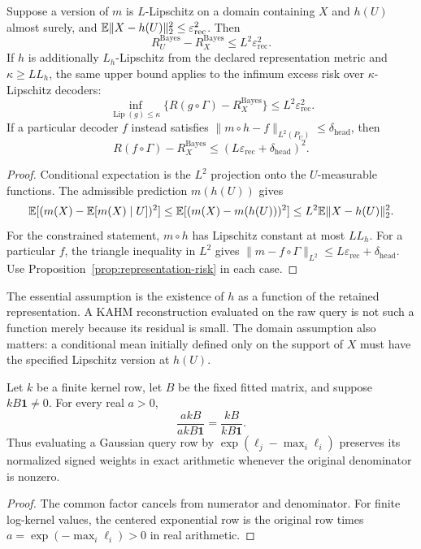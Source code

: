 \begin{proposition}
\label{prop:reconstruction-bridge}
Suppose a version of $m$ is $L$-Lipschitz on a domain containing $X$ and
$h(U)$ almost surely, and
$\mathbb{E}\|X-h(U)\|_2^2\leq\varepsilon_{\mathrm{rec}}^2$.
Then
\[
 R_U^{\mathrm{Bayes}}-R_X^{\mathrm{Bayes}}
 \leq L^2\varepsilon_{\mathrm{rec}}^2.
\]
If $h$ is additionally $L_h$-Lipschitz from the declared representation
metric and $\kappa\geq LL_h$, the same upper bound applies to the
infimum excess risk over $\kappa$-Lipschitz decoders:
\[
 \inf_{\operatorname{Lip}(g)\leq\kappa}
 \{R(g\circ\Gamma)-R_X^{\mathrm{Bayes}}\}
 \leq L^2\varepsilon_{\mathrm{rec}}^2.
\]
If a particular decoder
$f$ instead satisfies
$\|m\circ h-f\|_{L^2(P_U)}\leq\delta_{\mathrm{head}}$, then
\[
 R(f\circ\Gamma)-R_X^{\mathrm{Bayes}}
 \leq (L\varepsilon_{\mathrm{rec}}+\delta_{\mathrm{head}})^2.
\]
\end{proposition}
\begin{proof}
Conditional expectation is the $L^2$ projection onto the
$U$-measurable functions. The admissible prediction $m(h(U))$ gives
\[
 \mathbb{E}[(m(X)-\mathbb{E}[m(X)\mid U])^2]
 \leq \mathbb{E}[(m(X)-m(h(U)))^2]
 \leq L^2\mathbb{E}\|X-h(U)\|_2^2.
\]
For the constrained statement, $m\circ h$ has Lipschitz constant at
most $LL_h$. For a particular $f$, the triangle inequality in $L^2$
gives $\|m-f\circ\Gamma\|_{L^2}
\leq L\varepsilon_{\mathrm{rec}}+\delta_{\mathrm{head}}$.
Use Proposition~\ref{prop:representation-risk} in each case.
\end{proof}

The essential assumption is the existence of $h$ as a function of the
retained representation. A KAHM reconstruction evaluated on the raw query
is not such a function merely because its residual is small. The domain
assumption also matters: a conditional mean initially defined only on the
support of $X$ must have the specified Lipschitz version at $h(U)$.

\begin{proposition}
\label{prop:inner-scaling}
Let $k$ be a finite kernel row, let $B$ be the fixed fitted matrix, and
suppose $kB\boldsymbol 1\ne0$. For every real $a>0$,
\[
 \frac{akB}{akB\boldsymbol 1}
 =\frac{kB}{kB\boldsymbol 1}.
\]
Thus evaluating a Gaussian query row by
$\exp(\ell_j-\max_i\ell_i)$ preserves its normalized signed weights
in exact arithmetic whenever the original denominator is nonzero.
\end{proposition}
\begin{proof}
The common factor cancels from numerator and denominator.
For finite log-kernel values, the centered exponential row is the
original row times $a=\exp(-\max_i\ell_i)>0$ in real arithmetic.
\end{proof}

